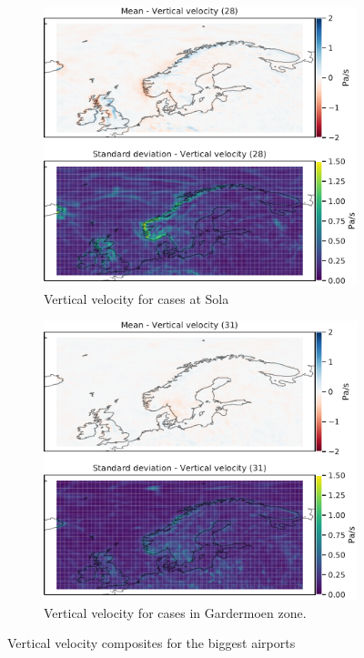 \begin{figure}
\begin{subfigure}[b]{0.49\textwidth}
         \includegraphics[width=\textwidth]{Figures/WENZV.pdf}
         \caption{Vertical velocity for cases at Sola}
         \label{fig:ENZVW}
     \end{subfigure}
    \begin{subfigure}[b]{0.5\textwidth}
    \centering
    \includegraphics[width=\textwidth]{Figures/WENGM.pdf}
    \caption{Vertical velocity for cases in Gardermoen zone.}
    \label{fig:ENGMW}
\end{subfigure}
\caption{Vertical velocity composites for the biggest airports}
\label{fig:verticalairports}
\end{figure}

